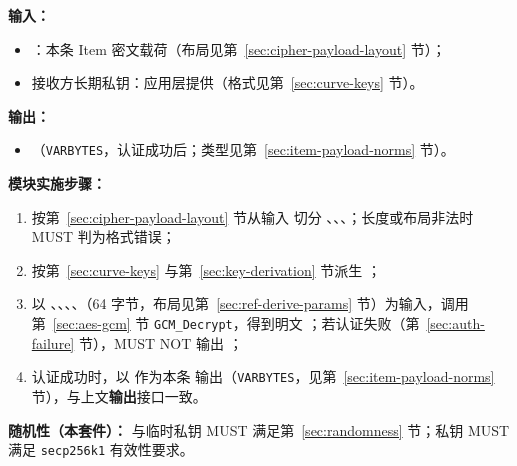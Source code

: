 \textbf{输入：}
\begin{itemize}
  \item {}：本条 Item 密文载荷（布局见第~\ref{sec:cipher-payload-layout} 节）；
  \item 接收方长期私钥：应用层提供（格式见第~\ref{sec:curve-keys} 节）。
\end{itemize}

\textbf{输出：}
\begin{itemize}
  \item {}（\texttt{VARBYTES}，认证成功后；类型见第~\ref{sec:item-payload-norms} 节）。
\end{itemize}

\textbf{模块实施步骤：}
\begin{enumerate}
  \item 按第~\ref{sec:cipher-payload-layout} 节从输入  切分 、、、；长度或布局非法时 MUST 判为格式错误；
  \item 按第~\ref{sec:curve-keys} 与第~\ref{sec:key-derivation} 节派生 ；
  \item 以 、、、、（64 字节，布局见第~\ref{sec:ref-derive-params} 节）为输入，调用第~\ref{sec:aes-gcm} 节 \texttt{GCM\_Decrypt}，得到明文 ；若认证失败（第~\ref{sec:auth-failure} 节），MUST NOT 输出 ；
  \item 认证成功时，以  作为本条  输出（\texttt{VARBYTES}，见第~\ref{sec:item-payload-norms} 节），与上文\textbf{输出}接口一致。
\end{enumerate}

\textbf{随机性（本套件）：} 与临时私钥 MUST 满足第~\ref{sec:randomness} 节；私钥 MUST 满足 \texttt{secp256k1} 有效性要求。
